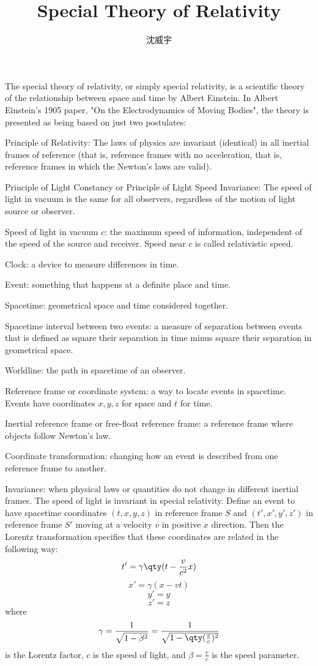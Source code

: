 \documentclass[a4paper,12pt]{article}
\begin{document}
\title{Special Theory of Relativity}
\author{沈威宇}
\date{\temtoday}
\titletocdoc
{}
The special theory of relativity, or simply special relativity, is a scientific theory of the relationship between space and time by Albert Einstein.
In Albert Einstein's 1905 paper, "On the Electrodynamics of Moving Bodies", the theory is presented as being based on just two postulates:
\ben
\item Principle of Relativity: The laws of physics are invariant (identical) in all inertial frames of reference (that is, reference frames with no acceleration, that is, reference frames in which the Newton's laws are valid).
\item Principle of Light Constancy or Principle of Light Speed Invariance: The speed of light in vacuum is the same for all observers, regardless of the motion of light source or observer.
\een
{}
\bit
\item Speed of light in vacuum $c$: the maximum speed of information, independent of the speed of the source and receiver. Speed near $c$ is called relativistic speed.
\item Clock: a device to measure differences in time.
\item Event: something that happens at a definite place and time.
\item Spacetime: geometrical space and time considered together.
\item Spacetime interval between two events: a measure of separation between events that is defined as square their separation in time minus square their separation in geometrical space.
\item Worldline: the path in spacetime of an observer.
\item Reference frame or coordinate system: a way to locate events in spacetime. Events have coordinates $x,y,z$ for space and $t$ for time.
\item Inertial reference frame or free-float reference frame: a reference frame where objects follow Newton's law.
\item Coordinate transformation: changing how an event is described from one reference frame to another.
\item Invariance: when physical laws or quantities do not change in different inertial frames. The speed of light is invariant in special relativity.
\eit
{}
Define an event to have spacetime coordinates $(t,x,y,z)$ in reference frame $S$ and $(t',x',y',z')$ in reference frame $S'$ moving at a velocity $v$ in positive $x$ direction. Then the Lorentz transformation specifies that these coordinates are related in the following way:
\[t'=\gamma\qty(t-\frac{v}{c^2}x)\]
\[x'=\gamma(x-vt)\]
\[y'=y\]
\[z'=z\]
where
\[\gamma=\frac{1}{\sqrt{1-\beta^2}}=\frac{1}{\sqrt{1-\qty(\frac{v}{c})^2}}\]
is the Lorentz factor, $c$ is the speed of light, and $\beta=\frac{v}{c}$ is the speed parameter.
\end{document}
